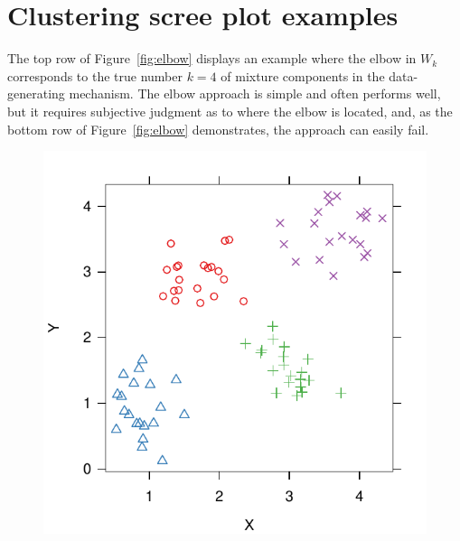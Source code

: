 \documentclass[12pt]{article}
\begin{document}
\section{Clustering scree plot examples}

\label{sec:elbow-fail}

The top row of Figure~\ref{fig:elbow}
displays an example where the elbow in $W_k$ corresponds to the true number $k
= 4$ of mixture components in the data-generating mechanism. The elbow
approach is simple and often performs well, but it requires subjective
judgment as to where the elbow is located, and, as the bottom row of
Figure~\ref{fig:elbow} demonstrates, the approach can easily fail.

\begin{figure}
\centering
\begin{minipage}{\linewidth}
  \begin{minipage}{0.45\linewidth}
    \includegraphics[width=\linewidth]{demo/elbow/correct-data.pdf}
  \end{minipage}
  \hspace{0.05in}
  \begin{minipage}{0.45\linewidth}

\end{minipage}
\end{minipage}
\end{figure}
\end{document}

